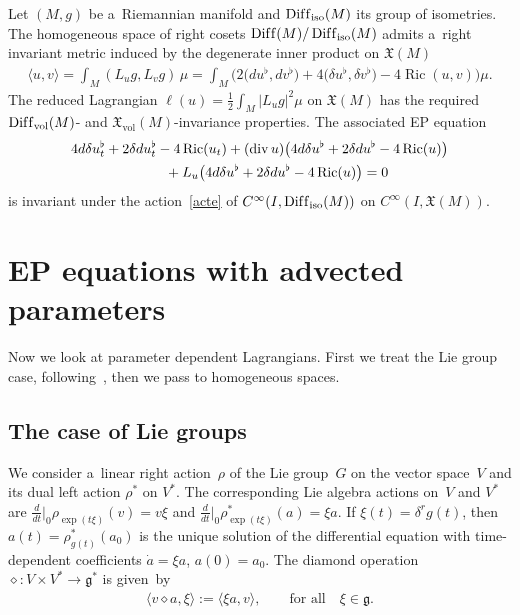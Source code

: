 \documentclass[10pt,a4paper]{amsart}
\numberwithin{equation}{section}
\begin{document}
\begin{Example}
\label{RM}
Let $(M,g)$ be a~Riemannian manifold and $\operatorname{Dif\/f}_{\operatorname{iso}}(M)$ its group of isometries.
The homogeneous space of right cosets $\operatorname{Dif\/f}(M)/\operatorname{Dif\/f}_{\operatorname{iso}}(M)$ admits
a~right invariant metric induced by the degenerate inner product on $\mathfrak X(M)$
\begin{gather*}
\langle u,v\rangle=\int_M(L_ug,L_vg)\,\mu
=\int_M \big(2\big(du^\flat,dv^\flat\big)+4\big(\delta u^\flat,\delta v^\flat\big)-4\operatorname{Ric}(u,v)\big)\mu.
\end{gather*}
The reduced Lagrangian $\ell(u)=\frac12\int_M|L_ug|^2\mu$ on $\mathfrak X(M)$ has the required
$\operatorname{Dif\/f}_{\operatorname{vol}}(M)$- and \linebreak $\mathfrak X_{\operatorname{vol}}(M)$-invariance properties.
The associated EP equation
\begin{gather*}
4d\delta u^\flat_t+2\delta du^\flat_t-4\operatorname{Ric}(u_t)  +(\operatorname{div} u)
\big(4d\delta u^\flat+2\delta du^\flat-4\operatorname{Ric}(u)\big)
\\
\hphantom{4d\delta u^\flat_t}
{}+L_u\big(4d\delta u^\flat+2\delta du^\flat-4\operatorname{Ric}(u)\big)=0
\end{gather*}
is invariant under the action~\eqref{acte} of $C^{\infty}(I,\operatorname{Dif\/f}_{\operatorname{iso}}(M))$ on
$C^{\infty}(I,\mathfrak X(M))$.
\end{Example}

\section{EP equations with advected parameters}
\label{s3}

Now we look at parameter dependent Lagrangians.
First we treat the Lie group case, follo\-wing~\cite{CHMR}, then we pass to homogeneous spaces.

\subsection{The case of Lie groups}

We consider a~linear right action~$\rho$ of the Lie group~$G$ on the vector space~$V$ and its dual left action $\rho^*$
on $V^*$.
The corresponding Lie algebra actions on~$V$ and $V^*$ are $\tfrac{d}{dt}\big|_0\rho_{\exp(t\xi)}(v)=v\xi$ and
$\tfrac{d}{dt}\big|_0\rho^*_{\exp(t\xi)}(a)=\xi a$.
If $\xi(t)=\delta^rg(t)$, then $a(t)=\rho^*_{g(t)}(a_0)$ is the unique solution of the dif\/ferential equation with
time-dependent coef\/f\/icients $\dot{a}=\xi a$, $a(0)=a_0$.
The diamond operation $\diamond:V\times V^*\to\mathfrak g^*$ is given~by
\begin{gather}
\label{dia}
\langle v\diamond a,\xi\rangle:=\langle \xi a,v\rangle,
\qquad
\text{for all}
\quad
\xi\in\mathfrak g.
\end{gather}
\end{document}
